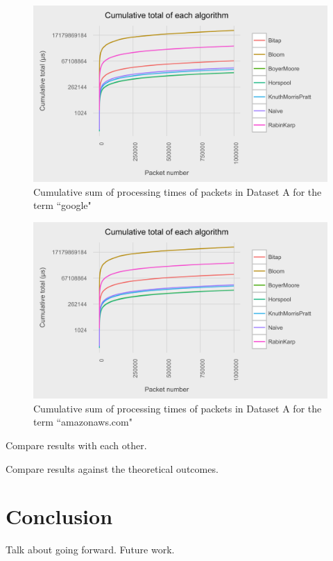 \documentclass{article}
\begin{document}
\begin{figure}[h!bt]
  \centering
  \includegraphics[width=\textwidth]{graphs/cum_sum_packets_google.png}
  \caption{Cumulative sum of processing times of packets in Dataset A for the term ``google"}
\end{figure}

\begin{figure}[h!bt]
  \centering
  \includegraphics[width=\textwidth]{graphs/cum_sum_packets_amazonaws-com.png}
  \caption{Cumulative sum of processing times of packets in Dataset A for the term ``amazonaws.com"}
\end{figure}

Compare results with each other.

Compare results against the theoretical outcomes.

\section{Conclusion}
Talk about going forward. Future work.
\nocite{*}




\end{document}
